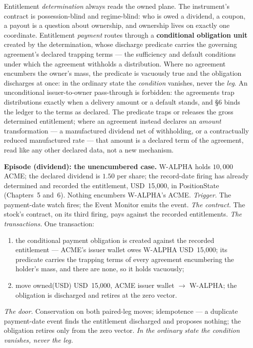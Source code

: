 \documentclass[11pt,a4paper]{article}
\newcommand{\USD}[1]{\mbox{USD~#1}}
\begin{document}
Entitlement \emph{determination} always reads the owned plane. The
instrument's contract is possession-blind and regime-blind: who is owed a
dividend, a coupon, a payout is a question about ownership, and ownership
lives on exactly one coordinate. Entitlement \emph{payment} routes through a
\textbf{conditional obligation unit} created by the determination, whose
discharge predicate carries the governing agreement's declared trapping terms
--- the sufficiency and default conditions under which the agreement withholds
a distribution. Where no agreement encumbers the owner's mass, the predicate
is vacuously true and the obligation discharges at once: in the ordinary state
the \emph{condition} vanishes, never the \emph{leg}. An unconditional
issuer-to-owner pass-through is forbidden: the agreements trap distributions
exactly when a delivery amount or a default stands, and \S6 binds the ledger
to the terms as declared. The predicate traps or releases the gross determined
entitlement; where an agreement instead declares an \emph{amount} transformation
--- a manufactured dividend net of withholding, or a contractually reduced
manufactured rate --- that amount is a declared term of the agreement, read like
any other declared data, not a new mechanism.

\medskip\noindent\textbf{Episode (dividend): the unencumbered case.}
W-ALPHA holds $10{,}000$ ACME; the declared dividend is $1.50$ per share; the
record-date firing has already determined and recorded the entitlement,
\USD{15,000}, in PositionState (Chapters~5 and~6). Nothing encumbers
W-ALPHA's ACME.
\emph{Trigger.} The payment-date watch fires; the Event Monitor emits the
event.
\emph{The contract.} The stock's contract, on its third firing, pays against
the recorded entitlements.
\emph{The transactions.} One transaction:
\begin{enumerate}[label=(\arabic*),nosep]
\item the conditional payment obligation is created against the recorded
entitlement --- ACME's issuer wallet owes W-ALPHA \USD{15,000}; its predicate
carries the trapping terms of every agreement encumbering the holder's mass,
and there are none, so it holds vacuously;
\item move owned(USD) \USD{15,000}, ACME issuer wallet $\to$ W-ALPHA; the
obligation is discharged and retires at the zero vector.
\end{enumerate}
\emph{The door.} Conservation on both paired-leg moves; idempotence --- a
duplicate payment-date event finds the entitlement discharged and proposes
nothing; the obligation retires only from the zero vector.
\emph{In the ordinary state the condition vanishes, never the leg.}
\end{document}
